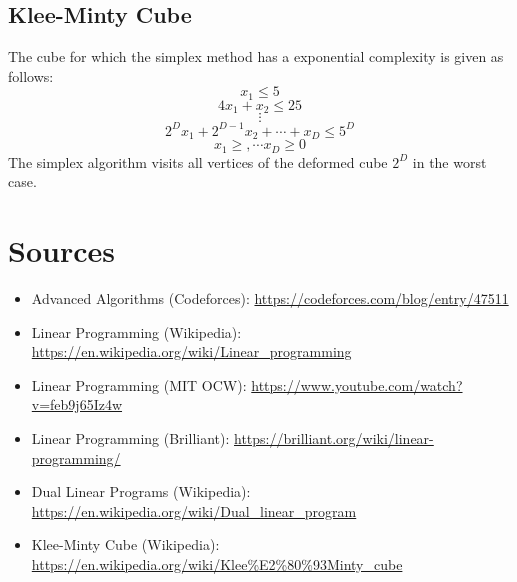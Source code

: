 \documentclass{article}
\begin{document}
\subsection{Klee-Minty Cube}
The cube for which the simplex method has a exponential complexity is given as follows:
$$x_{1}\leq 5$$
$$4x_{1}+x_{2}\leq 25$$
$$\vdots$$
$$2^{D}x_{1}+2^{D-1}x_{2}+\cdots+x_{D}\leq 5^{D}$$
$$x_{1}\geq,\cdots x_{D}\geq 0$$
The simplex algorithm visits all vertices of the deformed cube $2^{D}$ in the worst case.

\section{Sources}
\begin{itemize}
    \item Advanced Algorithms (Codeforces): \url{https://codeforces.com/blog/entry/47511}
    \item Linear Programming (Wikipedia): \url{https://en.wikipedia.org/wiki/Linear_programming}
    \item Linear Programming (MIT OCW): \url{https://www.youtube.com/watch?v=feb9j65Iz4w}
    \item Linear Programming (Brilliant): \url{https://brilliant.org/wiki/linear-programming/}
    \item Dual Linear Programs (Wikipedia): \url{https://en.wikipedia.org/wiki/Dual_linear_program}
    \item Klee-Minty Cube (Wikipedia): \url{https://en.wikipedia.org/wiki/Klee%E2%80%93Minty_cube}
\end{itemize}
\end{document}

